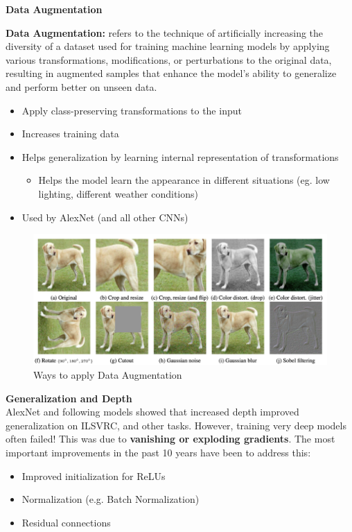 \noindent\textbf{Data Augmentation}

\begin{definition}
    \textbf{Data Augmentation:} refers to the technique of artificially increasing the diversity of a dataset used for training machine learning models by applying various transformations, modifications, or perturbations to the original data, resulting in augmented samples that enhance the model's ability to generalize and perform better on unseen data.
\end{definition}
\begin{itemize}
    \item Apply class-preserving transformations to the input
    \item Increases training data
    \item Helps generalization by learning internal representation of transformations
    \begin{itemize}
        \item Helps the model learn the appearance in different situations (eg. low lighting, different weather conditions)
    \end{itemize}
    \item Used by AlexNet (and all other CNNs)

\end{itemize}

\begin{figure}
    \centering
    \includegraphics[width=0.75\linewidth]{dataaugmentation.png}
    \caption{Ways to apply Data Augmentation}
    \label{fig:enter-label}
\end{figure}

\noindent\textbf{Generalization and Depth}\\

AlexNet and following models showed that increased depth improved generalization on ILSVRC, and other tasks. However, training very deep models often failed! This was due to \textbf{vanishing or exploding gradients}. The most important improvements in the past 10 years have been to address this:
\begin{itemize}
  \item Improved initialization for ReLUs
  \item Normalization (e.g. Batch Normalization)
  \item Residual connections
\end{itemize}

